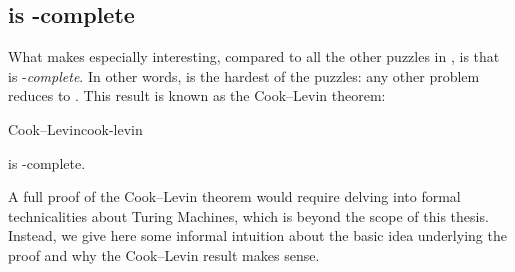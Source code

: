 






\subsection{ is \NP-complete}


What makes \CircSat{} especially interesting, compared to all the other puzzles
in \NP, is that \CircSat{} is \NP-\emph{complete}.  In other words, \CircSat{}
is the hardest of the \NP{} puzzles: any other \NP{} problem reduces to
\CircSat. This result is known as the Cook--Levin theorem:

\begin{theorem}{Cook--Levin}{cook-levin}

  \CircSat{} is \NP-complete.

\end{theorem}

A full proof of the Cook--Levin theorem would require delving into formal
technicalities about Turing Machines, which is beyond the scope of this thesis.
Instead, we give here some informal intuition about the basic idea underlying
the proof and why the Cook--Levin result makes sense.

